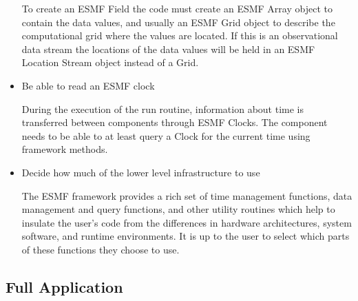 \begin{itemize}
To create an ESMF Field the code must create an ESMF Array object to
contain the data values, and usually an ESMF Grid object to describe the
computational grid where the values are located.  If this is an
observational data stream the locations of the data values will be held in
an ESMF Location Stream object instead of a Grid. 

\item Be able to read an ESMF clock

During the execution of the run routine, information about time 
is transferred between components through ESMF Clocks.  The 
component needs to be able to at least query a Clock for the 
current time using framework methods.

\item Decide how much of the lower level infrastructure to use

The ESMF framework provides a rich set of time management functions,
data management and query functions, and other utility
routines which help to insulate the user's code from the differences
in hardware architectures, system software, and runtime environments.
It is up to the user to select which parts of these functions they
choose to use.

\end{itemize}

\subsection{Full Application}

